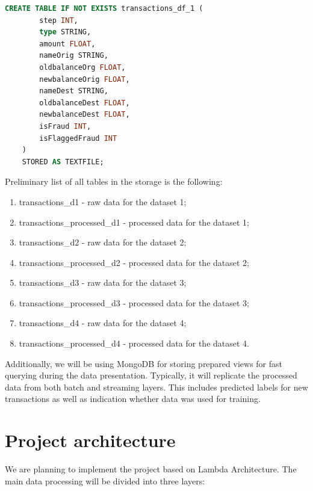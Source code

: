 \documentclass[12pt,a4paper, hidelinks]{article}
\begin{document}
\begin{lstlisting}[language=SQL, caption=Apache HIVE table creation]
    CREATE TABLE IF NOT EXISTS transactions_df_1 (
        step INT,
        type STRING,
        amount FLOAT,
        nameOrig STRING,
        oldbalanceOrg FLOAT,
        newbalanceOrig FLOAT,
        nameDest STRING,
        oldbalanceDest FLOAT,
        newbalanceDest FLOAT,
        isFraud INT,
        isFlaggedFraud INT
    )
    STORED AS TEXTFILE;
\end{lstlisting}

Preliminary list of all tables in the storage is the following:

\begin{enumerate}
    \item transactions\_d1 - raw data for the dataset 1;
    \item transactions\_processed\_d1 - processed data for the dataset 1;
    \item transactions\_d2 - raw data for the dataset 2;
    \item transactions\_processed\_d2 - processed data for the dataset 2;
    \item transactions\_d3 - raw data for the dataset 3;
    \item transactions\_processed\_d3 - processed data for the dataset 3;
    \item transactions\_d4 - raw data for the dataset 4;
    \item transactions\_processed\_d4 - processed data for the dataset 4.
\end{enumerate}

Additionally, we will be using MongoDB for storing prepared views for fast querying during the data presentation. Typically, it will replicate the processed data from both batch and streaming layers. This includes predicted labels for new transactions as well as indication whether data was used for training.


\section{Project architecture}

We are planning to implement the project based on Lambda Architecture. The main data processing will be divided into three layers:
\end{document}
